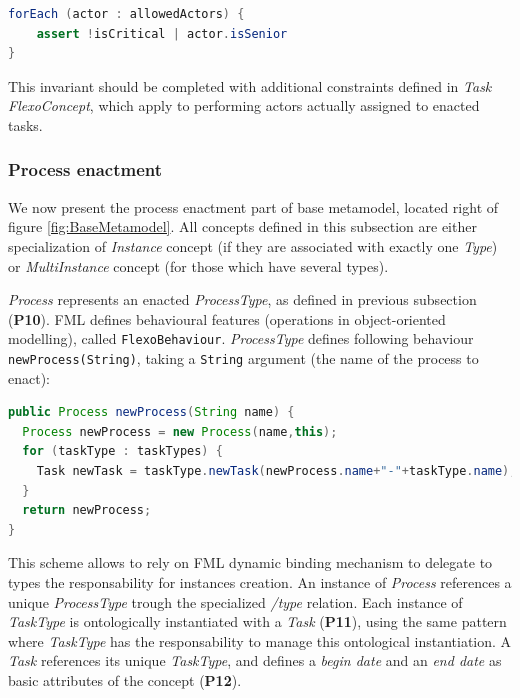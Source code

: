 \begin{lstlisting}[breaklines=true, language=java, basicstyle=\ttfamily\scriptsize, mathescape=true]
forEach (actor : allowedActors) {
    assert !isCritical | actor.isSenior
}
\end{lstlisting}

This invariant should be completed with additional constraints defined in \textit{Task} \textit{FlexoConcept}, which apply to performing actors actually assigned to enacted tasks. 

\subsubsection{Process enactment}

We now present the process enactment part of base metamodel, located right of figure \ref{fig:BaseMetamodel}. All concepts defined in this subsection are either specialization of \textit{Instance} concept (if they are associated with exactly one \textit{Type}) or \textit{MultiInstance} concept (for those which have several types).

\textit{Process} represents an enacted \textit{ProcessType}, as defined in previous subsection (\textbf{P10}). FML defines behavioural features (operations in object-oriented modelling), called \texttt{FlexoBehaviour}. \textit{ProcessType} defines following behaviour \texttt{newProcess(String)}, taking a \texttt{String} argument (the name of the process to enact):

\begin{lstlisting}[breaklines=true, language=java, basicstyle=\ttfamily\scriptsize, mathescape=true]
public Process newProcess(String name) {    
  Process newProcess = new Process(name,this);  
  for (taskType : taskTypes) {      
    Task newTask = taskType.newTask(newProcess.name+"-"+taskType.name),newProcess);        
  }      
  return newProcess;    
}    
\end{lstlisting}

This scheme allows to rely on FML dynamic binding mechanism to delegate to types the responsability for instances creation. An instance of \textit{Process} references a unique \textit{ProcessType} trough the specialized \textit{/type} relation. Each instance of \textit{TaskType} is ontologically instantiated with a \textit{Task} (\textbf{P11}), using the same pattern where \textit{TaskType} has the responsability to manage this ontological instantiation. A \textit{Task} references its unique \textit{TaskType}, and defines a \textit{begin date} and an \textit{end date} as basic attributes of the concept (\textbf{P12}).

